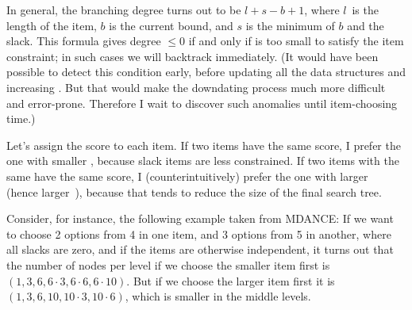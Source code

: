 In general, the branching degree turns out to be $l+s-b+1$, where
$l$~is the length of the item, $b$ is the current bound, and
$s$ is the minimum of $b$ and the slack. This formula gives degree
$\le0$ if and only if  is too small to satisfy the item
constraint; in such cases we will backtrack immediately.
(It would have been possible to detect this condition early,
before updating all the data structures and increasing . But that
would
make the downdating process much more difficult and error-prone. Therefore
I wait to discover such anomalies until item-choosing time.)

Let's assign the score  to each item. If two items have
the
same score, I prefer the one with smaller , because slack items
are less constrained. If two items with the same  have the same
score, I (counterintuitively)
prefer the one with larger~ (hence larger~), because
that tends to reduce the size of the final search tree.

Consider, for instance, the following example taken from {\mc MDANCE}:
If we want to choose 2 options from 4 in one item, and 3 options from 5 in
another,
where all slacks are zero, and if the items are otherwise independent,
it turns out that the number of nodes per level if we choose the smaller
item first is $(1,3,6,6\cdot3,6\cdot6,6\cdot10)$. But if we choose
the larger item first it is $(1,3,6,10,10\cdot3,10\cdot6)$, which is
smaller in the middle levels.

